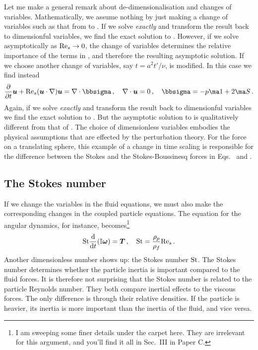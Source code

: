 \documentclass[thesis.tex]{subfiles}
\begin{document}
Let me make a general remark about de-dimensionalisation and changes of variables. Mathematically, we assume nothing by just making a change of variables such as that from  to . If we solve  \emph{exactly} and transform the result back to dimensionful variables, we find the exact solution to . However, if we solve  asymptotically as $\textrm{Re}_s\to0$, the change of variables determines the relative importance of the terms in , and therefore the resulting asymptotic solution. If we choose another change of variables, say $t = a^2t'/\nu$,  is modified. In this case we find instead
\begin{align}
\pdiff{}{t}\ve u + \Reys(\ve u \cdot \nabla) \ve u=\nabla \cdot \bbsigma\,,\quad \nabla \cdot \ve u = 0\,,\quad \bbsigma = -p \ma 1 + 2\ma S\,.\eqnlab{nsintrodimless2}
\end{align}
Again, if we solve  \emph{exactly} and transform the result back to dimensionful variables we find the exact solution to . But the asymptotic solution to  is qualitatively different from that of . The choice of dimensionless variables embodies the physical assumptions that are effected by the perturbation theory. For the force on a translating sphere, this example of a change in time scaling is responsible for the difference between the Stokes and the Stokes-Boussinesq forces in Eqs.~ and .

\subsection{The Stokes number}\label{sec:stokesnumber}
If we change the variables in the fluid equations, we must also make the corresponding changes in the coupled particle equations. The equation for the angular dynamics, for instance, becomes\footnote{I am sweeping some finer details under the carpet here. They are irrelevant for this argument, and you'll find it all in Sec.~III in Paper C.}
\begin{align}
	\mbox{St}\frac{\mathrm{d} }{\mathrm{d} t}(\mathbb{I} \mbox{\boldmath$\omega$}) = \mbox{\boldmath$T$}\,,\quad  \mbox{St}= \frac{\rho_p}{\rho_f}\textrm{Re}_s\,.
\end{align}
Another dimensionless number shows up: the Stokes number $\mbox{St}$. The Stokes number determines whether the particle inertia is important compared to the fluid forces. It is therefore not surprising that the Stokes number is related to the particle Reynolds number. They both compare inertial effects to the viscous forces. The only difference is through their relative densities. If the particle is heavier, its inertia is more important than the inertia of the fluid, and vice versa. 
\end{document}
